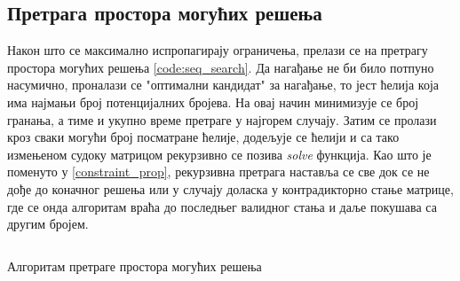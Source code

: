 \subsection{Претрага простора могућих решења}

Након што се максимално испропагирају ограничења, прелази се на претрагу простора могућих решења \ref{code:seq_search}. Да нагађање не би било потпуно насумично, проналази се "оптимални кандидат" за нагађање, то јест ћелија која има најмањи број потенцијалних бројева. На овај начин минимизује се број гранања, а тиме и укупно време претраге у најгорем случају. Затим се пролази кроз сваки могући број посматране ћелије, додељује се ћелији и са тако измењеном судоку матрицом рекурзивно се позива \textit{solve} функција. Као што је поменуто у \ref{constraint_prop}, рекурзивна претрага наставља се све док се не дође до коначног решења или у случају доласка у контрадикторно стање матрице, где се онда алгоритам враћа до последњег валидног стања и даље покушава са другим бројем.

\begin{listing}[H]
\inputminted{c}{kodovi/seq_search.c}
\caption{Алгоритам претраге  простора могућих решења}
\label{code:seq_search}
\end{listing}